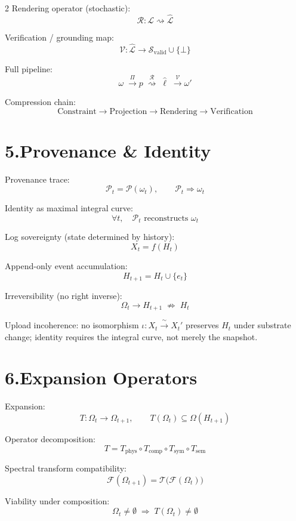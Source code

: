\documentclass[10pt,a4paper]{article}
\theoremstyle{plain}
\theoremstyle{remark}
\newcommand{\Pp}{\mathcal{P}}
\newcommand{\Svalid}{\mathcal{S}_{\mathrm{valid}}}
\begin{document}
\begin{multicols}{2}
Rendering operator (stochastic):
\[
\mathcal{R}:\mathcal{L}
\rightsquigarrow
\widehat{\mathcal{L}}
\]

Verification / grounding map:
\[
\mathcal{V}:
\widehat{\mathcal{L}}
\to
\Svalid\cup\{\bot\}
\]

Full pipeline:
\[
\omega
\;\xrightarrow{\;\Pi\;}
p
\;\overset{\mathcal{R}}{\rightsquigarrow}\;
\hat{\ell}
\;\xrightarrow{\;\mathcal{V}\;}
\omega'
\]

Compression chain:
\[
\text{Constraint}
\to
\text{Projection}
\to
\text{Rendering}
\to
\text{Verification}
\]

\section*{5.\enspace Provenance \& Identity}

Provenance trace:
\[
\Pp_t = \Pp(\omega_t),
\qquad
\Pp_t
\Rightarrow
\omega_t
\]

Identity as maximal integral curve:
\[
\forall t,\quad
\Pp_t
\text{ reconstructs }
\omega_t
\]

Log sovereignty (state determined by history):
\[
X_t = f(H_t)
\]

Append-only event accumulation:
\[
H_{t+1}
=
H_t\cup\{e_t\}
\]

Irreversibility (no right inverse):
\[
\Omega_t\to H_{t+1}
\;\not\Rightarrow\;
H_t
\]

Upload incoherence: no isomorphism $\iota: X_t \xrightarrow{\;\sim\;} X_t'$
preserves $H_t$ under substrate change; identity requires the integral curve, not merely the snapshot.

\section*{6.\enspace Expansion Operators}

Expansion:
\[
T:\Omega_t\to\Omega_{t+1},
\qquad
T(\Omega_t)
\subseteq
\Omega(H_{t+1})
\]

Operator decomposition:
\[
T
=
T_{\mathrm{phys}}
\circ
T_{\mathrm{comp}}
\circ
T_{\mathrm{sym}}
\circ
T_{\mathrm{sem}}
\]

Spectral transform compatibility:
\[
\mathcal{F}(\Omega_{t+1})
=
\mathcal{T}
\bigl(\mathcal{F}(\Omega_t)\bigr)
\]

Viability under composition:
\[
\Omega_t\neq\emptyset
\;\Rightarrow\;
T(\Omega_t)\neq\emptyset
\]


\end{multicols}
\end{document}
